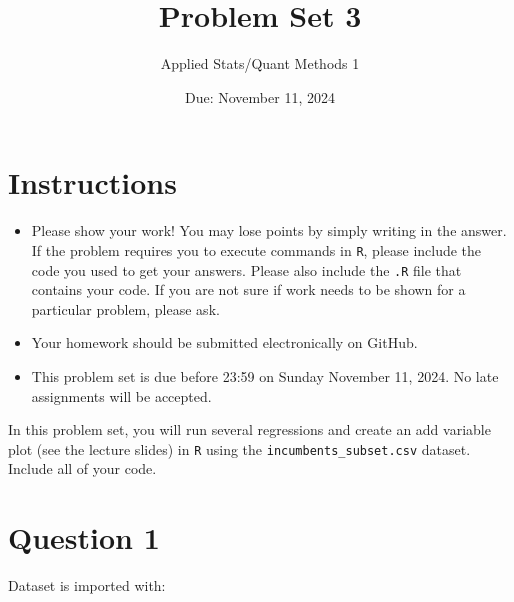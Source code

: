 \documentclass[12pt,letterpaper]{article}
\title{Problem Set 3}
\date{Due: November 11, 2024}
\author{Applied Stats/Quant Methods 1}
\begin{document}
	\maketitle
	\section*{Instructions}
	\begin{itemize}
		\item Please show your work! You may lose points by simply writing in the answer. If the problem requires you to execute commands in \texttt{R}, please include the code you used to get your answers. Please also include the \texttt{.R} file that contains your code. If you are not sure if work needs to be shown for a particular problem, please ask.
	\item Your homework should be submitted electronically on GitHub.
	\item This problem set is due before 23:59 on Sunday November 11, 2024. No late assignments will be accepted.

	\end{itemize}

		\vspace{.25cm}
	
\noindent In this problem set, you will run several regressions and create an add variable plot (see the lecture slides) in \texttt{R} using the \texttt{incumbents\_subset.csv} dataset. Include all of your code.

	\vspace{.5cm}
\section*{Question 1}
\vspace{.25cm}

Dataset is imported with:
  
\end{document}
